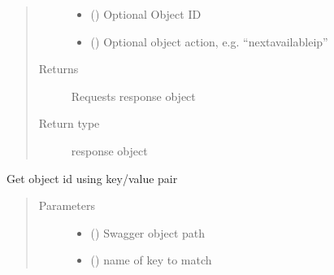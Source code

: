 \documentclass[letterpaper,10pt,english]{sphinxmanual}
\begin{document}
\begin{fulllineitems}
\begin{fulllineitems}
\begin{quote}
\begin{description}
\begin{itemize}
\item {} 
\sphinxAtStartPar
{} () \textendash{} Optional Object ID

\item {} 
\sphinxAtStartPar
{} () \textendash{} Optional object action, e.g. “nextavailableip”

\end{itemize}

\item[{Returns}] \leavevmode
\sphinxAtStartPar
Requests response object

\item[{Return type}] \leavevmode
\sphinxAtStartPar
response object

\end{description}\end{quote}

\end{fulllineitems}


\begin{fulllineitems}
\label{\detokenize{b1bootstrap-class:bloxone.b1bootstrap.get_id}}
\sphinxAtStartPar
Get object id using key/value pair
\begin{quote}\begin{description}
\item[{Parameters}] \leavevmode\begin{itemize}
\item {} 
\sphinxAtStartPar
{} () \textendash{} Swagger object path

\item {} 
\sphinxAtStartPar
{} () \textendash{} name of key to match


\end{itemize}
\end{description}
\end{quote}
\end{fulllineitems}
\end{fulllineitems}
\end{document}
